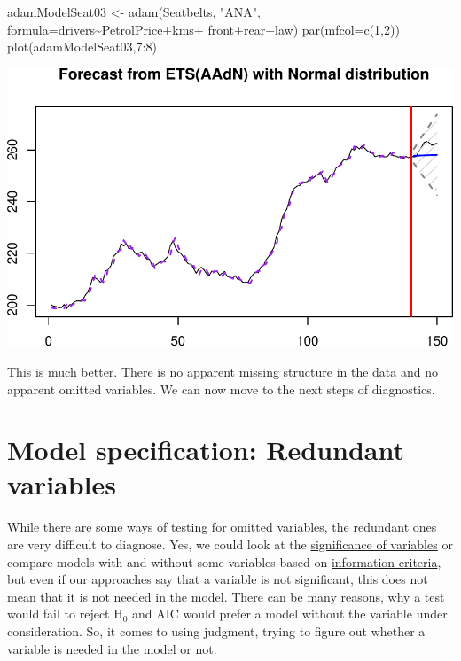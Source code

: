 \documentclass[
]{book}
\newenvironment{Shaded}{\begin{snugshade}}{\end{snugshade}}
\newcommand{\AttributeTok}[1]{\textcolor[rgb]{0.77,0.63,0.00}{#1}}
\newcommand{\DecValTok}[1]{\textcolor[rgb]{0.00,0.00,0.81}{#1}}
\newcommand{\FunctionTok}[1]{\textcolor[rgb]{0.00,0.00,0.00}{#1}}
\newcommand{\NormalTok}[1]{#1}
\newcommand{\OtherTok}[1]{\textcolor[rgb]{0.56,0.35,0.01}{#1}}
\newcommand{\SpecialCharTok}[1]{\textcolor[rgb]{0.00,0.00,0.00}{#1}}
\newcommand{\StringTok}[1]{\textcolor[rgb]{0.31,0.60,0.02}{#1}}
\theoremstyle{definition}
\theoremstyle{definition}
\theoremstyle{definition}
\theoremstyle{definition}
\theoremstyle{remark}
\begin{document}
\begin{Shaded}
\begin{Highlighting}[]
\NormalTok{adamModelSeat03 }\OtherTok{\textless{}{-}} \FunctionTok{adam}\NormalTok{(Seatbelts, }\StringTok{"ANA"}\NormalTok{,}
                        \AttributeTok{formula=}\NormalTok{drivers}\SpecialCharTok{\textasciitilde{}}\NormalTok{PetrolPrice}\SpecialCharTok{+}\NormalTok{kms}\SpecialCharTok{+}
\NormalTok{                          front}\SpecialCharTok{+}\NormalTok{rear}\SpecialCharTok{+}\NormalTok{law)}
\FunctionTok{par}\NormalTok{(}\AttributeTok{mfcol=}\FunctionTok{c}\NormalTok{(}\DecValTok{1}\NormalTok{,}\DecValTok{2}\NormalTok{))}
\FunctionTok{plot}\NormalTok{(adamModelSeat03,}\DecValTok{7}\SpecialCharTok{:}\DecValTok{8}\NormalTok{)}
\end{Highlighting}
\end{Shaded}

\includegraphics{adam_files/figure-latex/unnamed-chunk-127-1.pdf}

This is much better. There is no apparent missing structure in the data and no apparent omitted variables. We can now move to the next steps of diagnostics.

\hypertarget{diagnosticsRedundant}{%
\section{Model specification: Redundant variables}\label{diagnosticsRedundant}}

While there are some ways of testing for omitted variables, the redundant ones are very difficult to diagnose. Yes, we could look at the \protect\hyperlink{hypothesisTesting}{significance of variables} or compare models with and without some variables based on \protect\hyperlink{informationCriteria}{information criteria}, but even if our approaches say that a variable is not significant, this does not mean that it is not needed in the model. There can be many reasons, why a test would fail to reject H\(_0\) and AIC would prefer a model without the variable under consideration. So, it comes to using judgment, trying to figure out whether a variable is needed in the model or not.
\end{document}
